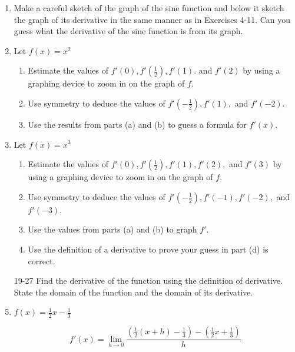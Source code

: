 \documentclass{article}
\begin{document}
\begin{enumerate}
		\item Make a careful sketch of the graph of the sine function and below it sketch
			the graph of its derivative in the same manner as in Exercises 4-11. Can you
			guess what the derivative of the sine function is from its graph.

		\item Let $f(x) = x^2$

		\begin{enumerate}
			\item Estimate the values of $f'(0), f'(\frac{1}{2}), f'(1).$ and $f'(2)$ by
			using a graphing device to zoom in on the graph of $f$.

			\item Use symmetry to deduce the values of $f'(-\frac{1}{2}), f'(1),$ and
				$f'(-2)$.

			\item Use the results from parts (a) and (b) to guess a formula for $f'(x)$.
		\end{enumerate}

		\item Let $f(x) = x^3$

		\begin{enumerate}
			\item Estimate the values of $f'(0), f'(\frac{1}{2}), f'(1), f'(2),$ and
			$f'(3)$ by using a graphing device to zoom in on the graph of $f$.

			\item Use symmetry to deduce the values of $f'(-\frac{1}{2}), f'(-1), f'(-2),$
				and $f'(-3)$.

			\item Use the values from parts (a) and (b) to graph $f'$.

			\item Use the definition of a derivative to prove your guess in part (d) is correct.
		\end{enumerate}

		\item[19-27] Find the derivative of the function using the definition of derivative. State the
				domain of the function and the domain of its derivative.

		\item $f(x) = \frac{1}{2}x - \frac{1}{3}$

			$$f'(x) = \lim \limits _{h \to 0} \frac{ (\frac{1}{2}(x+h) - \frac{1}{3}) - (\frac{1}{2}x + \frac{1}{3}) }{h}$$


\end{enumerate}
\end{document}

